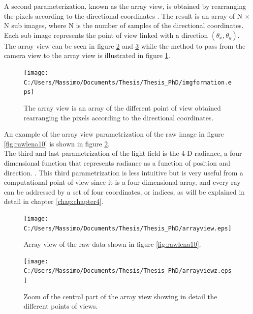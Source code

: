 A second parameterization, known as the array view, is obtained by rearranging the pixels according to the directional coordinates \cite{ng2006digital}. The result is an array of N $\times$ N sub images, where N is the number of samples of the directional coordinates. Each sub image represents the point of view linked with a direction $(\theta_x, \theta_y)$. The array view can be seen in figure \ref{fig:arrayview1} and \ref{fig:arrayview1z} while the method to pass from the camera view to the array view is illustrated in figure \ref{fig:arrayview}. \\
\begin{figure}[H]
	\centering
	\texttt{[image: C:/Users/Massimo/Documents/Thesis/Thesis\_PhD/imgformation.eps]}
	\caption{\label{fig:arrayview}The array view is an array of the different point of view obtained rearranging the pixels according to the directional coordinates.  }
\end{figure}
An example of the array view parametrization of the raw image in figure \ref{fig:rawlena10} is shown in figure \ref{fig:arrayview1}.\\
The third and last parametrization of the light field is the 4-D radiance, a four dimensional function that represents radiance as a function of position and direction. \cite{levoy1996light}. This third parametrization is less intuitive but is very useful from a computational point of view since it is a four dimensional array, and every ray can be addressed by a set of four coordinates, or indices, as will be explained in detail in chapter \ref{chap:chapter4}.
\newpage
\begin{figure}[H]
	\centering
	\texttt{[image: C:/Users/Massimo/Documents/Thesis/Thesis\_PhD/arrayview.eps]}
	\caption{\label{fig:arrayview1}Array view of the raw data shown in figure \ref{fig:rawlena10}.  }
\end{figure}
\begin{figure}[H]
	\centering
	\texttt{[image: C:/Users/Massimo/Documents/Thesis/Thesis\_PhD/arrayviewz.eps]}
	\caption{\label{fig:arrayview1z}Zoom of the central part of the array view showing in detail the different points of views.  }
\end{figure}
\newpage
